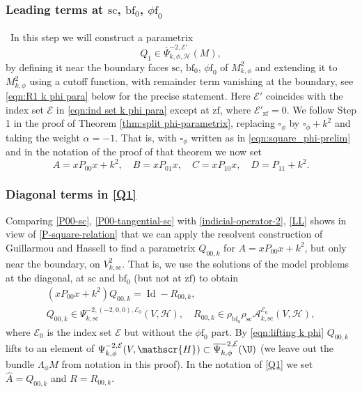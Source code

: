\documentclass[JEP,XML,SOM,Unicode,NoFloatCountersInSection,published]{cedram}
\theoremstyle{plain}
\theoremstyle{definition}
\newcommand{\Hmath}{{\mathscr{H}}}
\newcommand\calA{{\mathcal A}}
\newcommand\calE{{\mathcal E}}
\newcommand{\phif}{{\phi\mathrm{f}}}
\newcommand{\bbf}{{\mathrm{bf}}}
\newcommand{\ssc}{{\mathrm{sc}}}
\newcommand{\zf}{{\mathrm{zf}}}
\DeclareMathOperator{\Id}{Id}
\newcommand{\Psibar}{\overline{\Psi}}
\begin{document}
\subsubsection{Leading terms at $\ssc$, $\bbf_0$, $\phif_0$} \
In this step we will construct a parametrix
\begin{equation}
\label{eqn:Q_1 k phi para}
Q_1\in \Psibar_{k,\phi,\mathscr{H}}^{-2,\calE'} (M),
\end{equation}
by defining it near the boundary faces $\ssc$, $\bbf_0$, $\phif_0$ of $M^2_{k,\phi}$ and extending it to $M^2_{k,\phi}$ using a cutoff function,
with remainder term vanishing at the boundary, see \eqref{eqn:R1 k phi para} below for the precise
statement. Here $\calE'$ coincides with the index set $\calE$ in
\eqref{eqn:ind set k phi para} except at $\zf$, where $\calE'_\zf=0$.
We follow Step 1 in the proof of Theorem \ref{thm:split phi-parametrix},
replacing $\square_\phi$ by $\square_\phi+k^2$ and taking the weight $\alpha=-1$.
That is, with $\square_\phi$ written as in \eqref{eqn:square_phi-prelim} and in the
notation of the proof of that theorem we now set
\[
A=xP_{00}x+k^2, \quad B=xP_{01}x, \quad C=xP_{10}x, \quad D=P_{11}+k^2.
\]

\subsubsection*{Diagonal terms in \eqref{Q1}}
Comparing \eqref{P00-sc}, \eqref{P00-tangential-sc} with \eqref{indicial-operator-2}, \eqref{LL}
shows in view of \eqref{P-square-relation} that we can apply the
resolvent construction of Guillarmou and Hassell to find a parametrix $Q_{00,k}$ for $A=xP_{00}x+k^2$,
but only near the boundary, \ie on $V^2_{k,\ssc}$. That is, we use the solutions of the model
problems at the diagonal, at $\ssc$ and $\bbf_0$ (but not at $\zf$) to obtain
\begin{equation}
\begin{gathered}
(xP_{00}x+k^2)Q_{00,k} = \Id-R_{00,k},\\
Q_{00,k}\in\Psi_{k,\ssc}^{-2,(-2,0,0),\calE_0}(V,\Hmath), \quad
R_{00,k}\in \rho_{\bbf_0} \rho_\ssc\calA_{k,\ssc}^{\calE_0}(V,\Hmath),
\end{gathered}
\end{equation}
where $\calE_0$ is the index set $\calE$ but without the $\phif_0$ part.
By \eqref{eqn:lifting k phi} $Q_{00,k}$ lifts to an element of $\Psi^{-2,\calE}_{k,\phi}(V,\Hmath)\subset\Psibar^{-2,\calE}_{k,\phi}(\U)$ (we leave out the bundle $\Lambda_\phi M$ from notation in this proof).
In the notation of \eqref{Q1} we set $\widehat{A}= Q_{00,k}$ and $R = R_{00,k}$.
\end{document}
